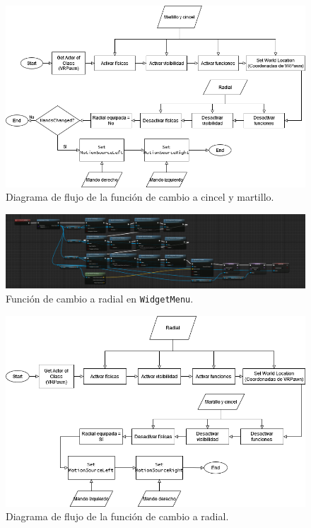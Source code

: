 \begin{figure}[H]
	\centering
	\includegraphics[width=12cm]{imagenes/flowchart7}
	\caption{Diagrama de flujo de la función de cambio a cincel y martillo.}
	\label{fig:fc7}
\end{figure}

\begin{figure}[H]
	\centering
	\includegraphics[width=12cm]{imagenes/cambiararadial}
	\caption{Función de cambio a radial en \texttt{WidgetMenu}.}
	\label{fig:cambiararadial}
\end{figure}

\begin{figure}[H]
	\centering
	\includegraphics[width=12cm]{imagenes/flowchart8}
	\caption{Diagrama de flujo de la función de cambio a radial.}
	\label{fig:fc8}
\end{figure}

